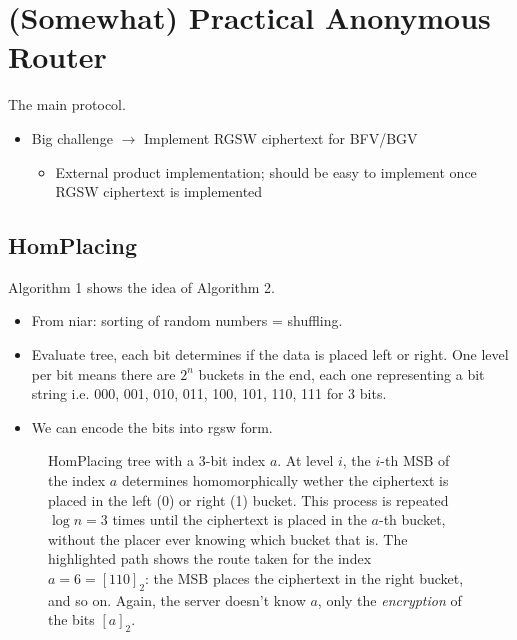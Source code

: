\section{(Somewhat) Practical Anonymous Router}
The main protocol.



\ifnotes
\begin{itemize}
    \item Big challenge $\to$ Implement RGSW ciphertext for BFV/BGV
    \begin{itemize}
        \item External product implementation; should be easy to implement once RGSW ciphertext is implemented
    \end{itemize}
\end{itemize}
\fi

\subsection{HomPlacing}
Algorithm 1 shows the idea of Algorithm 2.

\begin{itemize}
    \item From \gls{niar}: sorting of random numbers = shuffling.
    \item Evaluate tree, each bit determines if the data is placed left or right. One level per bit means there are $2^n$ buckets in the end, each one representing a bit string i.e. 000, 001, 010, 011, 100, 101, 110, 111 for 3 bits.
    \item We can encode the bits into \gls{rgsw} form.
\end{itemize}

\begin{figure}[ht!]
    \centering
    
    \caption{HomPlacing tree with a 3-bit index $a$. At level $i$, the $i$-th MSB of the index $a$ determines homomorphically wether the ciphertext is placed in the left (0) or right (1) bucket. This process is repeated $\log{n}=3$ times until the ciphertext is placed in the $a$-th bucket, without the placer ever knowing which bucket that is. The highlighted path shows the route taken for the index $a = 6 = [110]_2$: the MSB places the ciphertext in the right bucket, and so on. Again, the server doesn't know $a$, only the \emph{encryption} of the bits $[a]_2$. %
    }
    \label{fig:hom-placing-1}
\end{figure}


\clearpage


